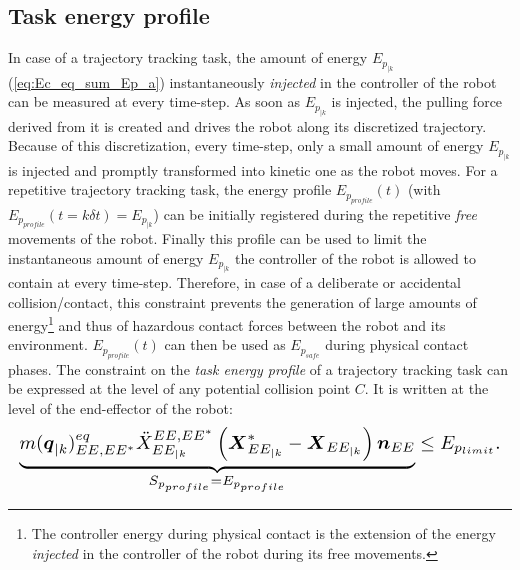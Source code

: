 \documentclass[letterpaper, 10 pt, conference]{ieeeconf}      %
\newcommand{\vect}[1]{\mbox{\boldmath${#1}$}}%
\begin{document}
\subsection{Task energy profile} 
\label{subsec:Task_energy_profile}
In case of a trajectory tracking task, the amount of energy $E_{p_{|k}}$ (\ref{eq:Ec_eq_sum_Ep_a}) instantaneously \textit{injected} in the  controller of the robot can be measured at every time-step. As soon as $E_{p_{|k}}$ is injected, the pulling force derived from it is created and drives the robot along its discretized trajectory. Because of this discretization, every time-step, only a small amount of energy $E_{p_{|k}}$ is injected and promptly transformed into kinetic one as the robot moves. For a repetitive trajectory tracking task, the energy profile $E_{p_{profile}}(t)$ (with $E_{p_{profile}}(t=k \delta t) = E_{p_{|k}}$) can be initially registered during the repetitive \textit{free} movements of the robot. Finally this profile can be used to limit the instantaneous amount of energy $E_{p_{|k}}$ the controller of the robot is allowed to contain at every time-step. Therefore, in case of a deliberate or accidental collision/contact, this constraint prevents the generation of large amounts of energy\footnote{The controller energy during physical contact is the extension of the energy \textit{injected} in the controller of the robot during its free movements.} and thus of hazardous contact forces between the robot and its environment. $E_{p_{profile}}(t)$ can then be used as $E_{p_{safe}}$ during physical contact phases.
The constraint on the \textit{task energy profile} of a trajectory tracking task can be expressed at the level of any potential collision point $C$. It is written at the level of the end-effector of the robot:   
\begin{equation}
\resizebox{1\hsize}{!}{$
\underbrace{m(\vect{q}_{|k})_{EE,EE^*}^{eq} \ddot{X}_{EE_{|k}}^{EE,EE^*} \left(\vect{X}_{EE_{|k}}^{*} - \vect{X}_{EE_{|k}}\right) \vect{n}_{EE}}_{S_{p_{profile}} = E_{p_{profile}}} \leq E_{p_{limit}}.$}
\label{eq:Ep_constr_30}
\end{equation} 
\end{document}
